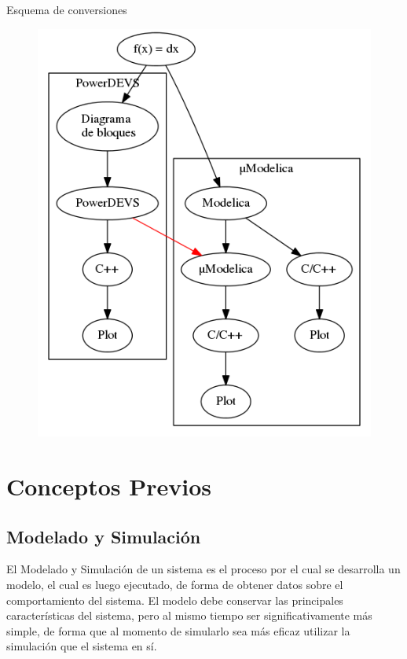 \documentclass[10pt,presentation]{beamer}
\begin{document}
\begin{frame}{Esquema de conversiones}
\begin{figure}
\centering
 \includegraphics[width=.60\linewidth]{esquema}
\end{figure}
\end{frame}

\section{Conceptos Previos}
	\subsection{Modelado y Simulación}
\begin{frame}
\begin{block}{El Modelado y Simulación}
de un sistema es el proceso por el cual se desarrolla un modelo, el cual es luego ejecutado, de forma de obtener datos sobre el comportamiento del sistema. El modelo debe conservar las principales características del sistema, pero al mismo tiempo ser significativamente más simple, de forma que al momento de simularlo sea más eficaz utilizar la simulación que el sistema en sí.
\end{block}
\end{frame}
\end{document}

